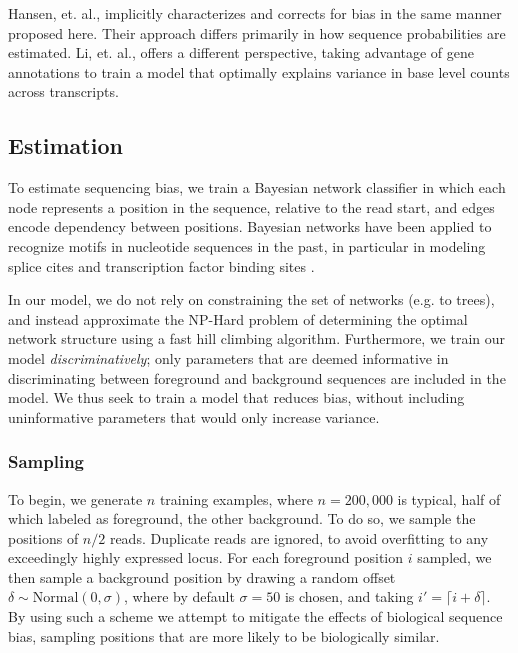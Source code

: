 \documentclass{bioinfo}
\begin{document}
Hansen, et. al., \cite{Hansen2010} implicitly characterizes and corrects for
bias in the same manner proposed here. Their approach differs primarily in how
sequence probabilities are estimated. Li, et. al., \cite{Li2010} offers a
different perspective, taking advantage of gene annotations to train a model
that optimally explains variance in base level counts across transcripts.


\subsection{Estimation}

To estimate sequencing bias, we train a Bayesian network classifier in which
each node represents a position in the sequence, relative to the read start, and
edges encode dependency between positions. Bayesian networks have been
applied to recognize motifs in nucleotide sequences in the past, in particular
in modeling splice cites \cite{Cai2000} \cite{Chen2005} and transcription factor
binding sites \cite{Ben-Gal2005} \cite{Grau2006} \cite{Pudimat2005}. 

In our model, we do not rely on constraining the set of networks (e.g. to
trees), and instead approximate the NP-Hard problem of determining the optimal
network structure using a fast hill climbing algorithm. Furthermore, we
train our model \emph{discriminatively}; only parameters that are deemed
informative in discriminating between foreground and background sequences are
included in the model. We thus seek to train a model that reduces bias, without
including uninformative parameters that would only increase variance.


\subsubsection{Sampling}

To begin, we generate $n$ training examples, where $n = 200,000$ is typical, half of
which labeled as foreground, the other background. To do so, we sample the
positions of $n/2$ reads. Duplicate reads are ignored, to avoid overfitting to
any exceedingly highly expressed locus.  For each foreground position $i$
sampled, we then sample a background position by drawing a random offset $\delta
\sim \text{Normal}( 0, \sigma )$, where by default $\sigma = 50$ is chosen, and
taking $i' = \lceil i + \delta \rceil$. By using such a scheme we attempt to
mitigate the effects of biological sequence bias, sampling positions that are
more likely to be biologically similar.
\end{document}
